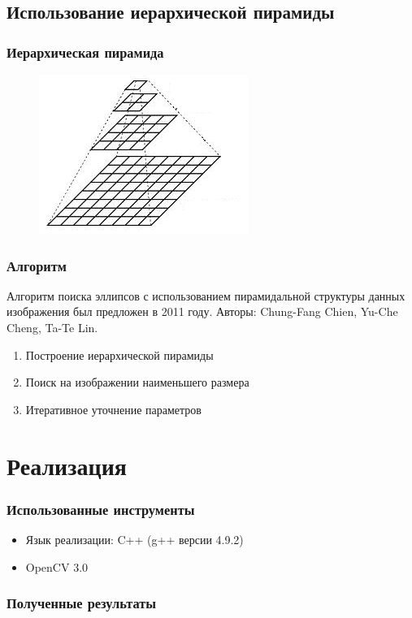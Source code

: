 \documentclass[14pt]{beamer}
\begin{document}
\subsection{Использование иерархической пирамиды}
\begin{frame}
\frametitle{Иерархическая пирамида}
\begin{figure}[H]
  \center
  \includegraphics[width=0.6\linewidth]{Pyramid}
\end{figure}
\end{frame}

\begin{frame}
\frametitle{Алгоритм}
Алгоритм поиска эллипсов с использованием пирамидальной структуры данных изображения был предложен в 2011 году. Авторы: Chung-Fang Chien, Yu-Che Cheng, Ta-Te Lin.
\begin{enumerate}
  \item Построение иерархической пирамиды
  \item Поиск на изображении наименьшего размера
  \item Итеративное уточнение параметров
\end{enumerate}
\end{frame}

\section{Реализация}
\begin{frame}
\frametitle{Использованные инструменты}
\begin{itemize}
  \item Язык реализации: C++ (g++ версии 4.9.2)
  \item OpenCV 3.0
\end{itemize}
\end{frame}

\begin{frame}
\frametitle{Полученные результаты}
\begin{figure}[H]
  \center
{}
\end{figure}
\end{frame}
\end{document}

